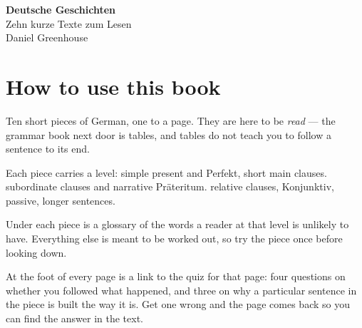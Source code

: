 \documentclass[10pt,twoside,openany]{book}
\begin{document}
\frontmatter
\thispagestyle{empty}
\vspace*{\fill}
\begin{center}
  {\sffamily\bfseries\Huge Deutsche Geschichten}\\[6pt]
  {\sffamily\large\color{Faint} Zehn kurze Texte zum Lesen}\\[18pt]
  {\sffamily\color{Faint} Daniel Greenhouse}
\end{center}
\vspace*{\fill}

\cleardoublepage
\chapter*{How to use this book}

Ten short pieces of German, one to a page. They are here to be \emph{read} —
the grammar book next door is tables, and tables do not teach you to follow a
sentence to its end.

Each piece carries a level:  simple present and Perfekt, short
main clauses.  subordinate clauses and narrative Präteritum.
 relative clauses, Konjunktiv, passive, longer sentences.

Under each piece is a glossary of the words a reader at that level is unlikely
to have. Everything else is meant to be worked out, so try the piece once
before looking down.

At the foot of every page is a link to the quiz for that page: four questions
on whether you followed what happened, and three on why a particular sentence
in the piece is built the way it is. Get one wrong and the page comes back so
you can find the answer in the text.

\cleardoublepage
\pagestyle{plain}
\tableofcontents
{}

\mainmatter
\pagestyle{grammar}


\end{document}
